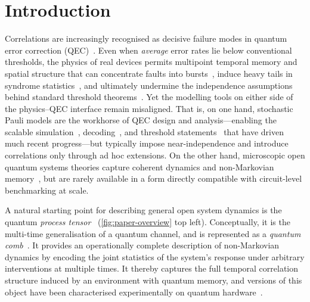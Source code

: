 \section{Introduction}\label{sec:introduction}
Correlations are increasingly recognised as decisive failure modes in quantum error correction (QEC)~\cite{harperLearningCorrelatedNoise2023,fkamDetrimentalNonMarkovianErrors2025}. Even when \emph{average} error rates lie below conventional thresholds, the physics of real devices permits multipoint temporal memory and spatial structure that can concentrate faults into bursts~\cite{mcewenRemovingLeakageinducedCorrelated2021,mcewenResolvingCatastrophicError2022,acharyaQuantumErrorCorrection2025,bratrudMeasurementCorrelatedCharge2025,harringtonSynchronousDetectionCosmic2025}, induce heavy tails in syndrome statistics~\cite{claderImpactCorrelationsHeavy2021}, and ultimately undermine the independence assumptions behind standard threshold theorems~\cite{aharonovFaultTolerantQuantumComputation2006,terhalFaulttolerantQuantumComputation2005,ngFaulttolerantQuantumComputation2009}. Yet the modelling tools on either side of the physics--QEC interface remain misaligned. That is, on one hand, stochastic Pauli models are the workhorse of QEC design and analysis---enabling the scalable simulation~\cite{gidneyStimFastStabilizer2021}, decoding~\cite{higgottPyMatchingPythonPackage2022,higgottSparseBlossomCorrecting2025}, and threshold statements~\cite{dennisTopologicalQuantumMemory2002,fowlerSurfaceCodesPractical2012} that have driven much recent progress---but typically impose near-independence and introduce correlations only through ad hoc extensions. On the other hand, microscopic open quantum systems theories capture coherent dynamics and non-Markovian memory~\cite{breuerTheoryOpenQuantum2007,breuerColloquiumNonMarkovianDynamics2016,milzQuantumStochasticProcesses2021}, but are rarely available in a form directly compatible with circuit-level benchmarking at scale.

A natural starting point for describing general open system dynamics is the quantum \emph{process tensor}~\cite{pollockNonMarkovianQuantumProcesses2018,milzQuantumStochasticProcesses2021} (\cref{fig:paper-overview} top left). Conceptually, it is the multi-time generalisation of a quantum channel, and is represented as a \emph{quantum comb}~\cite{chiribellaQuantumCircuitArchitecture2008,chiribellaTheoreticalFrameworkQuantum2009,oreshkovQuantumCorrelationsNo2012,costaQuantumCausalModelling2016,whiteUnifyingNonMarkovianCharacterization2025,tarantoHigherOrderQuantumOperations2025}. It provides an operationally complete description of non-Markovian dynamics by encoding the joint statistics of the system's response under arbitrary interventions at multiple times. It thereby captures the full temporal correlation structure induced by an environment with quantum memory, and versions of this object have been characterised experimentally on quantum hardware~\cite{whiteDemonstrationNonMarkovianProcess2020,whiteNonMarkovianQuantumProcess2022,whiteManytimePhysicsPractice2024,zhangLearningForecastingOpen2025}.

